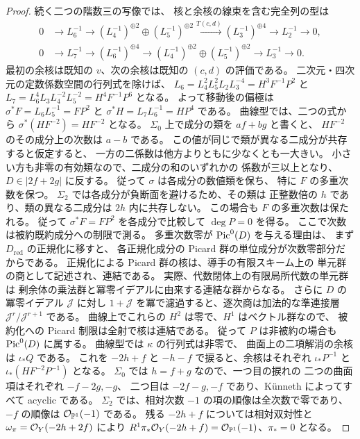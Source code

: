 \begin{proof}
続く二つの階数三の写像では、
核と余核の線束を含む完全列の型は
\[
\begin{aligned}
0&\to L_6^{-1}\to
 (L_4^{-1})^{\oplus2}\oplus (L_5^{-1})^{\oplus2}
 \xrightarrow{T(c,d)} (L_3^{-1})^{\oplus4}
 \to L_2^{-1}\to0,\\
0&\to L_7^{-1}\to (L_6^{-1})^{\oplus4}
 \to (L_4^{-1})^{\oplus2}\oplus (L_5^{-1})^{\oplus2}
 \to L_3^{-1}\to0 .
\end{aligned}
\]
最初の余核は既知の $v$、次の余核は既知の $(c,d)$ の評価である。
二次元・四次元の定数係数空間の行列式を除けば、
$L_6=L_4^2L_5^2L_2L_3^{-4}=H^3F^{-1}P^2$ と
$L_7=L_6^4L_3L_4^{-2}L_5^{-2}=H^4F^{-1}P^6$ となる。
よって移動後の偏極は
$\sigma^*F=L_6L_5^{-1}=FP^2$ と
$\sigma^*H=L_7L_6^{-1}=HP^4$ である。
曲線型では、二つの式から $\sigma^*(HF^{-2})=HF^{-2}$ となる。
$\Sigma_0$ 上で成分の類を $af+bg$ と書くと、
$HF^{-2}$ のその成分上の次数は $a-b$ である。
この値が同じで類が異なる二成分が共存すると仮定すると、
一方の二係数は他方よりともに少なくとも一大きい。
小さい方も非零の有効類なので、二成分の和のいずれかの
係数が三以上となり、$D\in|2f+2g|$ に反する。
従って $\sigma$ は各成分の数値類を保ち、
特に $F$ の多重次数を保つ。
$\Sigma_2$ では各成分が負断面を避けるため、その類は
正整数倍の $h$ であり、類の異なる二成分は $2h$ 内に共存しない。
この場合も $F$ の多重次数は保たれる。
従って $\sigma^*F=FP^2$ を各成分で比較して $\deg P=0$ を得る。
ここで次数は被約既約成分への制限で測る。
多重次数零が $\operatorname{Pic}^0(D)$ を与える理由は、
まず $D_{\mathrm{red}}$ の正規化に移すと、
各正規化成分の Picard 群の単位成分が次数零部分だからである。
正規化による Picard 群の核は、導手の有限スキーム上の
単元群の商として記述され、連結である。
実際、代数閉体上の有限局所代数の単元群は
剰余体の乗法群と冪零イデアルに由来する連結な群からなる。
さらに $D$ の冪零イデアル $\mathcal J$ に対し
$1+\mathcal J$ を冪で濾過すると、逐次商は加法的な準連接層
$\mathcal J^r/\mathcal J^{r+1}$ である。
曲線上でこれらの $H^2$ は零で、$H^1$ はベクトル群なので、
被約化への Picard 制限は全射で核は連結である。
従って $P$ は非被約の場合も $\operatorname{Pic}^0(D)$ に属する。
曲線型では $\kappa$ の行列式は非零で、
曲面上の二項解消の余核は $\iota_*Q$ である。
これを $-2h+f$ と $-h-f$ で捩ると、余核はそれぞれ
$\iota_*P^{-1}$ と $\iota_*(HF^{-2}P^{-1})$ となる。
$\Sigma_0$ では $h=f+g$ なので、一つ目の捩れの
二つの曲面項はそれぞれ $-f-2g,-g$、
二つ目は $-2f-g,-f$ であり、Künneth によってすべて acyclic である。
$\Sigma_2$ では、相対次数 $-1$ の項の順像は全次数で零であり、
$-f$ の順像は $\mathcal O_{\mathbb P^1}(-1)$ である。
残る $-2h+f$ については相対双対性と
$\omega_\pi=\mathcal O_Y(-2h+2f)$ により
$R^1\pi_*\mathcal O_Y(-2h+f)=\mathcal O_{\mathbb P^1}(-1)$、$\pi_*=0$ となる。

\end{proof}
